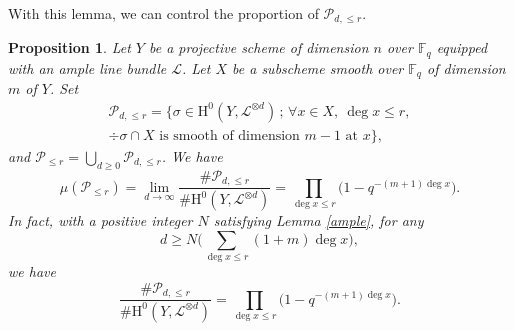 \documentclass[JEP,XML,SOM,Unicode,published]{cedram}
\newcommand{\sep}{\,;\,}
\theoremstyle{plain}
\newtheorem{prop}[thm]{Proposition}
\theoremstyle{definition}
\newcommand{\ho}{\mathrm{H}}
\newcommand{\li}{\mathcal{L}}
\newcommand{\F}{\mathbb{F}}
\begin{document}
With this lemma, we can control the proportion of $\mathcal{P}_{d,\leq r}$.

\begin{prop}\label{smallf}
Let $Y$ be a projective scheme of dimension $n$ over $\F_q$ equipped with an ample line bundle $\li$. Let $X$ be a subscheme smooth over $\F_q$ of dimension $m$ of $Y$. Set
\begin{multline*}
\mathcal{P}_{d,\leq r}=\{ \sigma\in \ho^0(Y,\li^{\otimes d})\sep \forall x\in X,\ \deg x\leq r,\\ \div \sigma\cap X \text{ is smooth of dimension } m-1 \text{ at }x \},
\end{multline*}
and $\mathcal{P}_{\leq r}=\bigcup_{d\geq 0}\mathcal{P}_{d,\leq r}$.
We have
\[
\mu(\mathcal{P}_{\leq r})=\lim_{d\to \infty} \frac{\#\mathcal{P}_{d,\leq r}}{\#\ho^0(Y, \li^{\otimes d})}=\prod_{\deg x\leq r} \bigl(1-q^{-(m+1)\deg x} \bigr).
\]
In fact, with a positive integer $N$ satisfying Lemma \ref{ample}, for any
\[
d\geq N\bigl(\sum_{\deg x\leq r}(1+ m)\deg x\bigr),
\]
we have
\[
\frac{\#\mathcal{P}_{d,\leq r}}{\#\ho^0(Y, \li^{\otimes d})}=\prod_{\deg x\leq r} \bigl(1-q^{-(m+1)\deg x} \bigr).
\]
\end{prop}
\end{document}
